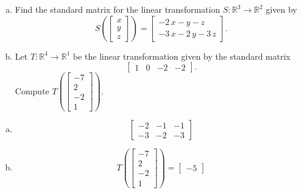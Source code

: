 
\begin{exerciseStatement}

\begin{enumerate}[(a)]
\item Find the standard matrix for the linear transformation \(S:\mathbb{R}^ 3  \to \mathbb{R}^ 2 \) given by \[S\left(  \left[\begin{array}{c}
x \\
y \\
z
\end{array}\right]  \right) =  \left[\begin{array}{c}
-2 \, x - y - z \\
-3 \, x - 2 \, y - 3 \, z
\end{array}\right] .\]
\item Let \(T:\mathbb{R}^ 4  \to \mathbb{R}^ 1 \) be the linear transformation given by the standard matrix \[ \left[\begin{array}{cccc}
1 & 0 & -2 & -2
\end{array}\right] .\] Compute \(T\left( \left[\begin{array}{c}
-7 \\
2 \\
-2 \\
1
\end{array}\right]  \right)\). 
\end{enumerate}
    
\end{exerciseStatement}
    
\begin{exerciseAnswer} 

\begin{enumerate}[(a)]
\item \[ \left[\begin{array}{ccc}
-2 & -1 & -1 \\
-3 & -2 & -3
\end{array}\right] \]
\item \[T\left( \left[\begin{array}{c}
-7 \\
2 \\
-2 \\
1
\end{array}\right]  \right)= \left[\begin{array}{c}
-5
\end{array}\right] \]
\end{enumerate}
    
\end{exerciseAnswer}
    

